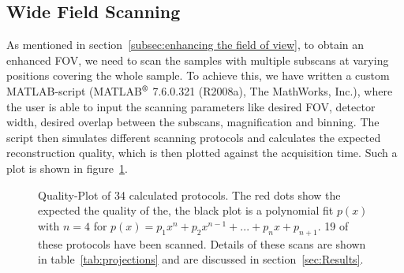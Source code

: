 
\subsection{Wide Field Scanning}
As mentioned in section~\ref{subsec:enhancing the field of view}, to obtain an enhanced FOV, we need to scan the samples with multiple subscans at varying positions covering the whole sample. To achieve this, we have written a custom MATLAB-script (MATLAB$^\text{\textregistered}$ 7.6.0.321 (R2008a), The MathWorks, Inc.), where the user is able to input the scanning parameters like desired FOV, detector width, desired overlap between the subscans, magnification and binning. The script then simulates different scanning protocols and calculates the expected reconstruction quality, which is then plotted against the acquisition time. Such a plot is shown in figure~\ref{fig:2008c-qualityplot}.

\begin{figure}
	\centering
		
	\caption{Quality-Plot of 34 calculated protocols. The red dots show the expected the quality of the, the black plot is a polynomial fit $p(x)$ with $n=4$ for $p(x)=p_{1}x^{n}+p_{2}x^{n-1}+...+p_{n}x+p_{n+1}$. 19 of these protocols have been scanned. Details of these scans are shown in table~\ref{tab:projections} and are discussed in section~\ref{sec:Results}.}
	\label{fig:2008c-qualityplot}
\end{figure}


